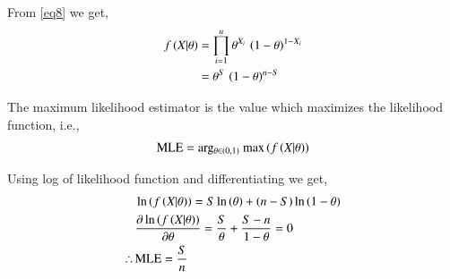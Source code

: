 \documentclass[journal,12pt,twocolumn]{IEEEtran}
\begin{document}
\begin{lemma}
From \eqref{eq8} we get,
\begin{align}
    f\left(X|\theta\right) &= \prod_{i=1}^n\theta^{X_i}\,\left(1-\theta\right)^{1-X_i}\nonumber\\
    &=\theta^S\,\left(1-\theta\right)^{n-S}\label{eq7}
\end{align}
\end{lemma}
\begin{definition}
The maximum likelihood estimator is the value which maximizes the likelihood function, i.e.,
\begin{align}
    \text{MLE} = \text{arg$_{\theta \in (0,1)}$ max}\left(f\left(X|\theta\right)\right)
\end{align}
\end{definition}

Using log of likelihood function and differentiating we get,
\begin{align}
    &\ln\left({f\left(X|\theta\right)}\right) = S\ln\left({\theta}\right) + \left(n-S\right)\ln\left({1-\theta}\right)\\
    &\frac{\partial \ln\left({f\left(X|\theta\right)}\right)}{\partial \theta} = \frac{S}{\theta} + \frac{S-n}{1-\theta} = 0 \nonumber\\
     \therefore\, &\text{MLE} = \frac{S}{n}
\end{align}
\end{document}
